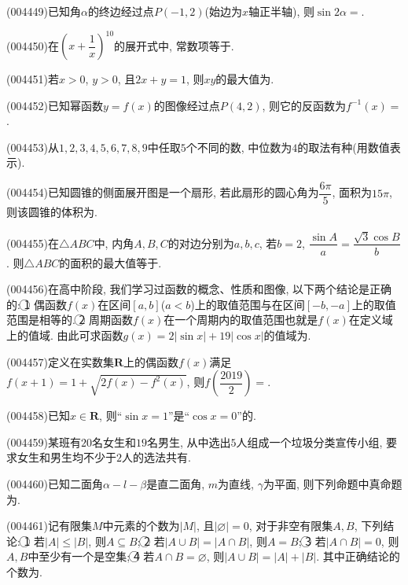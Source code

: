 \item (004449)已知角$\alpha$的终边经过点$P(-1,2)$(始边为$x$轴正半轴), 则$\sin 2\alpha=$.
\item (004450)在$(x+\dfrac 1x)^{10}$的展开式中, 常数项等于.
\item (004451)若$x>0$, $y>0$, 且$2x+y=1$, 则$xy$的最大值为.
\item (004452)已知幂函数$y=f(x)$的图像经过点$P(4,2)$, 则它的反函数为$f^{-1}(x)=$.
\item (004453)从$1,2,3,4,5,6,7,8,9$中任取$5$个不同的数, 中位数为$4$的取法有种(用数值表示).
\item (004454)已知圆锥的侧面展开图是一个扇形, 若此扇形的圆心角为$\dfrac{6\pi}5$, 面积为$15\pi$, 则该圆锥的体积为.
\item (004455)在$\triangle ABC$中, 内角$A,B,C$的对边分别为$a,b,c$, 若$b=2$, $\dfrac{\sin A}{a}=\dfrac{\sqrt{3}\cos B}{b}$. 则$\triangle ABC$的面积的最大值等于.
\item (004456)在高中阶段, 我们学习过函数的概念、性质和图像, 以下两个结论是正确的: \textcircled{1} 偶函数$f(x)$在区间$[a,b]$($a<b$)上的取值范围与在区间$[-b,-a]$上的取值范围是相等的. \textcircled{2} 周期函数$f(x)$在一个周期内的取值范围也就是$f(x)$在定义域上的值域. 由此可求函数$g(x)=2|\sin x|+19|\cos x|$的值域为.
\item (004457)定义在实数集$\mathbf{R}$上的偶函数$f(x)$满足$f(x+1)=1+\sqrt{2f(x)-f^2(x)}$, 则$f(\dfrac{2019}{2})=$.
\item (004458)已知$x\in \mathbf{R}$, 则``$\sin x=1$''是``$\cos x=0$''的.
\item (004459)某班有$20$名女生和$19$名男生, 从中选出$5$人组成一个垃圾分类宣传小组, 要求女生和男生均不少于$2$人的选法共有.
\item (004460)已知二面角$\alpha-l-\beta$是直二面角, $m$为直线, $\gamma$为平面, 则下列命题中真命题为.
\item (004461)记有限集$M$中元素的个数为$|M|$, 且$|\varnothing|=0$, 对于非空有限集$A,B$, 下列结论: \textcircled{1} 若$|A|\le |B|$, 则$A\subseteq B$; \textcircled{2} 若$|A\cup B|=|A\cap B|$, 则$A=B$; \textcircled{3} 若$|A\cap B|=0$, 则$A,B$中至少有一个是空集; \textcircled{4} 若$A\cap B=\varnothing$, 则$|A\cup B|=|A|+|B|$. 其中正确结论的个数为.
